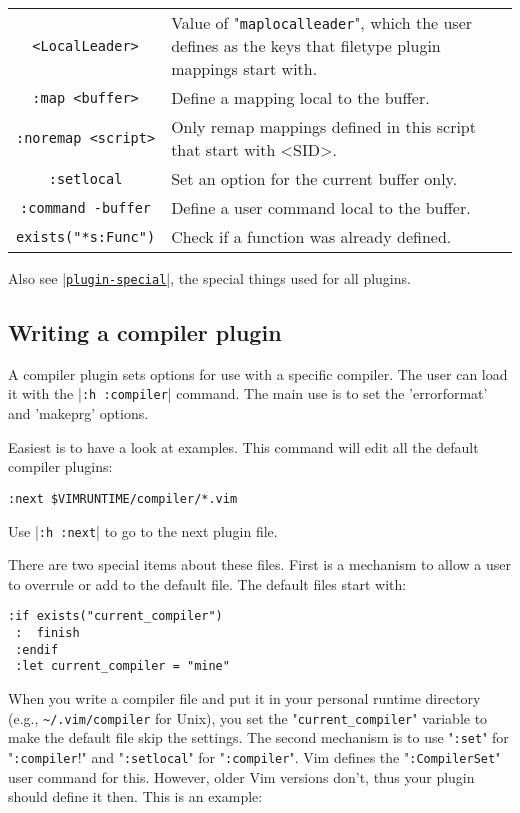\begin{center} \begin{tabular}{c l}
				\verb!<LocalLeader>! & Value of "\verb!maplocalleader!", which the user defines as the keys that filetype plugin mappings start with. \\
				\verb!:map <buffer>! & Define a mapping local to the buffer. \\
				\verb!:noremap <script>! & Only remap mappings defined in this script that start with <SID>. \\
				\verb!:setlocal! & Set an option for the current buffer only. \\
				\verb!:command -buffer! & Define a user command local to the buffer. \\
				\verb!exists("*s:Func")! & Check if a function was already defined. \\
\end{tabular} \end{center}

Also see \hyperref[plugin-special]{|\texttt{plugin-special}|}, the special things used for all plugins.
\subsection{Writing a compiler plugin}
\label{write-compiler-plugin}
A compiler plugin sets options for use with a specific compiler.
The user can load it with the |\verb!:h :compiler!| command.
The main use is to set the 'errorformat' and 'makeprg' options.

Easiest is to have a look at examples.
This command will edit all the default compiler plugins:

\begin{Verbatim}[samepage=true]
 :next $VIMRUNTIME/compiler/*.vim
\end{Verbatim}

Use |\verb!:h :next!| to go to the next plugin file.

There are two special items about these files.
First is a mechanism to allow a user to overrule or add to the default file.
The default files start with:

\begin{Verbatim}[samepage=true]
 :if exists("current_compiler")
 :  finish
 :endif
 :let current_compiler = "mine"
\end{Verbatim}

When you write a compiler file and put it in your personal runtime directory (e.g., \verb!~/.vim/compiler! for Unix), you set the "\verb!current_compiler!" variable to make the default file skip the settings.
\label{:CompilerSet}
The second mechanism is to use "\verb!:set!" for "\verb!:compiler!!" and "\verb!:setlocal!" for "\verb!:compiler!".
Vim defines the "\verb!:CompilerSet!" user command for this.
However, older Vim versions don't, thus your plugin should define it then.
This is an example:

